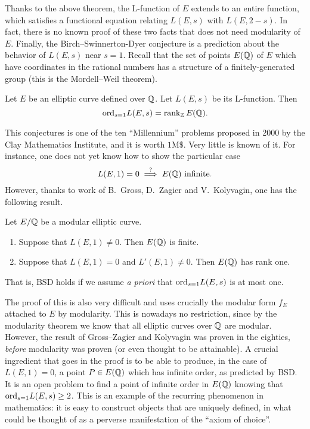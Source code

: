 Thanks to the above theorem, the L-function of $E$ extends to an entire function, which satisfies a functional equation relating $L(E,s)$ with $L(E,2-s)$. In fact, there is no known proof of these two facts that does not need modularity of $E$. Finally, the Birch--Swinnerton-Dyer conjecture is a prediction about the behavior of $L(E,s)$ near $s=1$. Recall that the set of points $E(\mathbb{Q})$ of $E$ which have coordinates in the rational numbers has a structure of a finitely-generated group (this is the Mordell--Weil theorem).
\begin{conjecture}
Let $E$ be an elliptic curve defined over $\mathbb{Q}$. Let $L(E,s)$ be its L-function. Then
  \[
{\text{ord}}_{s=1} L(E,s) = \operatorname{rank}_{\mathbb{Z}} E(\mathbb{Q}).
\]
\end{conjecture}
This conjectures is one of the ten ``Millennium'' problems proposed in 2000 by the Clay Mathematics Institute, and it is worth $1\text{M}\$$. Very little is known of it. For instance, one does not yet know how to show the particular case
\[
L(E,1)=0\stackrel{?}{\implies} E(\mathbb{Q})\text{ infinite}.
\]
However, thanks to work of B.~Gross, D.~Zagier and V.~Kolyvagin, one has the following result.
\begin{theorem}
Let $E/\mathbb{Q}$ be a modular elliptic curve.
\begin{enumerate}
\item Suppose that $L(E,1)\neq 0$. Then $E(\mathbb{Q})$ is finite.
\item Suppose that $L(E,1)=0$ and $L'(E,1)\neq 0$. Then $E(\mathbb{Q})$ has rank one.
\end{enumerate}
That is, BSD holds if we assume \emph{a priori} that  ${\text{ord}}_{s=1} L(E,s)$ is at most one.
\end{theorem}
The proof of this is also very difficult and uses crucially the modular form $f_E$ attached to $E$ by modularity. This is nowadays no restriction, since by the modularity theorem we know that all elliptic curves over $\mathbb{Q}$ are modular. However, the result of Gross--Zagier and Kolyvagin was proven in the eighties, \emph{before} modularity was proven (or even thought to be attainable). A crucial ingredient that goes in the proof is to be able to produce, in the case of $L(E,1)=0$, a point $P \in E(\mathbb{Q})$ which has infinite order, as predicted by BSD. It is an open problem to find a point of infinite order in $E(\mathbb{Q})$ knowing that ${\text{ord}}_{s=1} L(E,s)\geq 2$. This is an example of the recurring phenomenon in mathematics: it is easy to construct objects that are uniquely defined, in what could be thought of as a perverse manifestation of the ``axiom of choice''.

